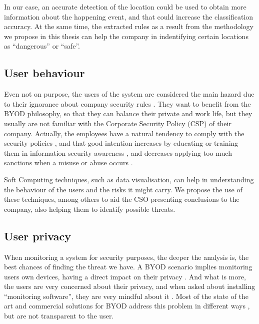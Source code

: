 In our case, an accurate detection of the location could be used to obtain more information about the happening event, and that could increase the classification accuracy. At the same time, the extracted rules as a result from the methodology we propose in this thesis can help the company in indentifying certain locations as ``dangerous'' or ``safe''.

\subsection{User behaviour}
\label{subsec:behav}

Even not on purpose, the users of the system are considered the main hazard due to their ignorance about company security rules  \cite{Adams_users99}. They want to benefit from the BYOD philosophy, so that they can balance their private and work life, but they usually are not familiar with the Corporate Security Policy (CSP) of their company.  Actually, the employees have a natural tendency to comply with the security policies \cite{Sip_SecPriv07,Bulg_SecPol10,AlOmari_SecPol12}, and that good intention increases by educating or training them in information security awareness  \cite{Shaw_SecAware09}, and decreases applying too much sanctions when a misuse or abuse occurs \cite{Her_SecPol09}.

Soft Computing techniques, such as data visualisation, can help in understanding the behaviour of the users and the risks it might carry. We propose the use of these techniques, among others to aid the CSO presenting conclusions to the company, also helping them to identify possible threats.

\subsection{User privacy}
\label{subsec:user_priv}

When monitoring a system for security purposes, the deeper the analysis is, the best chances of finding the threat we have. A BYOD scenario implies monitoring users own devices, having a direct impact on their privacy \cite{Miller12Privacy}. And what is more, the users are very concerned about their privacy, and when asked about installing ``monitoring software'', they are very mindful about it \cite{Miller12Privacy, ali2015analysis}. Most of the state of the art and commercial solutions for BYOD address this problem in different ways \cite{de2015corporate}, but are not transparent to the user.

